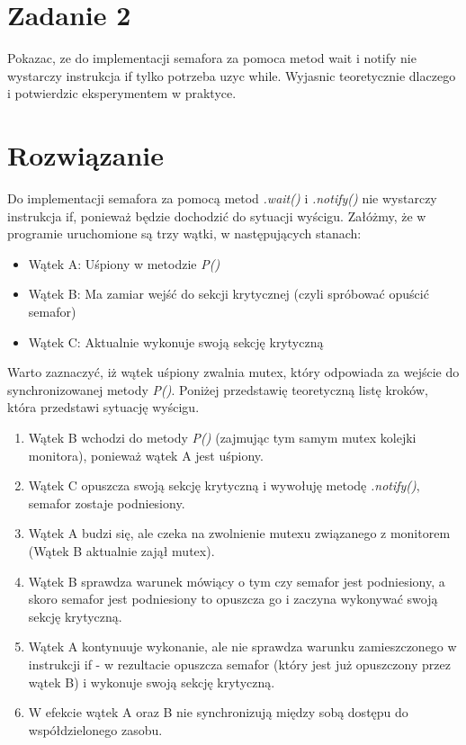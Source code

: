 \documentclass[12pt]{article}
\begin{document}
\section{Zadanie 2}
Pokazac, ze do implementacji semafora za pomoca metod wait i notify nie wystarczy instrukcja if tylko potrzeba uzyc while. Wyjasnic teoretycznie dlaczego i potwierdzic eksperymentem w praktyce.

\section{Rozwiązanie}
Do implementacji semafora za pomocą metod \emph{.wait()} i \emph{.notify()} nie wystarczy instrukcja if, ponieważ będzie dochodzić do sytuacji wyścigu. Załóżmy, że w programie uruchomione są trzy wątki, w następujących stanach:
\begin{itemize}
    \item Wątek A: Uśpiony w metodzie \emph{P()}
    \item Wątek B: Ma zamiar wejść do sekcji krytycznej (czyli spróbować opuścić semafor)
    \item Wątek C: Aktualnie wykonuje swoją sekcję krytyczną  
\end{itemize}

Warto zaznaczyć, iż wątek uśpiony zwalnia mutex, który odpowiada za wejście do synchronizowanej metody \emph{P()}. Poniżej przedstawię teoretyczną listę kroków, która przedstawi sytuację wyścigu.

\begin{enumerate}
    \item Wątek B wchodzi do metody \emph{P()} (zajmując tym samym mutex kolejki monitora), ponieważ wątek A jest uśpiony.
    \item Wątek C opuszcza swoją sekcję krytyczną i wywołuję metodę \emph{.notify()}, semafor zostaje podniesiony.
    \item Wątek A budzi się, ale czeka na zwolnienie mutexu związanego z monitorem (Wątek B aktualnie zajął mutex).
    \item Wątek B sprawdza warunek mówiący o tym czy semafor jest podniesiony, a skoro semafor jest podniesiony to opuszcza go i zaczyna wykonywać swoją sekcję krytyczną.
    \item Wątek A kontynuuje wykonanie, ale nie sprawdza warunku zamieszczonego w instrukcji if - w rezultacie opuszcza semafor (który jest już opuszczony przez wątek B) i wykonuje swoją sekcję krytyczną.
    \item W efekcie wątek A oraz B nie synchronizują między sobą dostępu do współdzielonego zasobu.
\end{enumerate}
\end{document}
